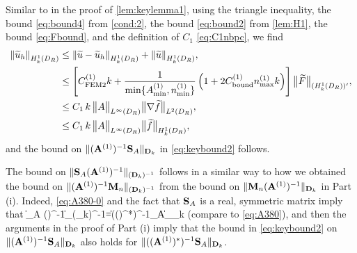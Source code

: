 Similar to in the proof of \cref{lem:keylemma1},
using the triangle inequality, the bound \cref{eq:bound4} from \cref{cond:2}, the bound \cref{eq:bound2} from \cref{lem:H1}, the bound \cref{eq:Fbound}, and the definition of $C_1$ \cref{eq:C1nbpc},
we find
\begin{align}\nonumber 
\N{\tu_h}_{\HokDR} &\leq
\N{\tu-\tu_h}_{\HokDR} + \N{\tu}_{\HokDR},\nonumber \\ \nonumber
& \leq \left[ C^{(1)}_{\rm FEM2} k + 
\frac{1}{\min\{\Asomin,\nsomin\}}\left( 1 + 2 C^{(1)}_{\rm bound}\nsomax k  \right) 
\right]\big\|\widetilde{F}\big\|_{(\HokDR)'},\\
&\leq C_1 \, k\, 
\big\|A\big\|_{L^\infty(\DR)} \big\|\nabla\widetilde{f}\big\|_{\LtDR},\label{eq:mainevent2}\\
&\leq C_1 \, k\, 
\big\|A\big\|_{L^\infty(\DR)} \big\|\widetilde{f}\big\|_{\HokDR},\nonumber
\end{align}
and the bound on $\|(\mathbf{A}^{(1)})^{-1}\mathbf{S}_A\|_{\mathbf{D}_k}$ in \cref{eq:keybound2} follows.

The bound on $\|\mathbf{S}_A(\mathbf{A}^{(1)})^{-1}\|_{(\mathbf{D}_k)^{-1}}$ follows in a similar way to how we obtained the 
bound on  $\|(\mathbf{A}^{(1)})^{-1}\mathbf{M}_n\|_{(\mathbf{D}_k)^{-1}}$ from the bound on $\|\mathbf{M}_n(\mathbf{A}^{(1)})^{-1}\|_{\mathbf{D}_k}$ in Part (i). Indeed, 
\cref{eq:A380-0} and the fact that $\mathbf{S}_A$ is a real, symmetric matrix imply that 
\beq\label{eq:A380-2} 
 \big\|\Smat_A (\Amato)^{-1}\big\|_{(\Dmat_k)^{-1}}=\big\|\big((\Amato)^*\big)^{-1}\Smat_A\big\|_{\Dmat_k}
 \eeq 
(compare to \cref{eq:A380}),
and then the arguments in the proof of Part (i) imply that 
the bound in \cref{eq:keybound2} on $\|(\mathbf{A}^{(1)})^{-1}\mathbf{S}_A\|_{\mathbf{D}_k}$ also holds for $\|((\mathbf{A}^{(1)})^*)^{-1}\mathbf{S}_A\|_{\mathbf{D}_k}$.

